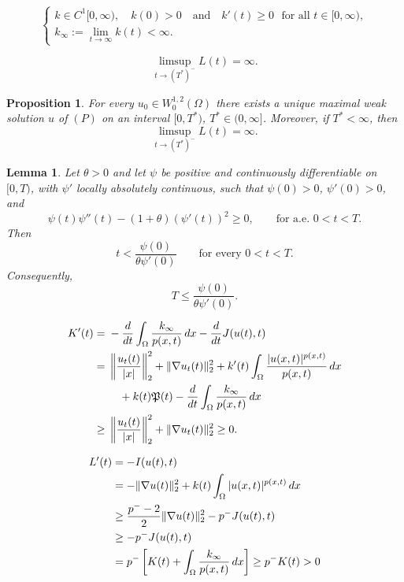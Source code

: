 \documentclass[10pt,a4paper]{amsart}
\newtheorem{proposition}{Proposition}
\newtheorem{lemma}{Lemma}
\begin{document}
\begin{equation} \label{eq:k-assumption}
	\begin{cases}
		k \in C^1[0,\infty), 
		\quad k(0) > 0
		\quad \mbox{and} \quad
		k'(t) \ge 0  \,\, \mbox{ for all } t \in [0,\infty),
		\\[2mm]
		k_\infty := \displaystyle\lim_{t\to\infty} k(t) < \infty.
	\end{cases}
\end{equation}

	\begin{equation} \label{eq:blowup}
		\limsup_{t\to(T^*)^-}L(t)=\infty.
	\end{equation}

\begin{proposition}\label{prop:local}
For every $u_0\in W^{1,2}_0(\Omega)$ there exists a unique maximal weak solution $u$ of $(P)$ on an interval $[0,T^*)$, $T^*\in(0,\infty]$. Moreover, if $T^*<\infty$, then
\[
\limsup_{t\to(T^*)^-}L(t)=\infty.
\]
\end{proposition}

\begin{lemma} \label{lem:concavity}
	Let $\theta>0$ and let $\psi$ be positive and continuously differentiable on $[0,T)$, with $\psi'$ locally absolutely continuous, such that
	$\psi(0)>0$, $\psi'(0)>0$, and
	\[
	\psi(t)\psi''(t)-(1+\theta)(\psi'(t))^2\ge0,
	\qquad \text{for a.e. }0<t<T.
	\]
	Then
	\[
	t<\frac{\psi(0)}{\theta\psi'(0)}
	\qquad\text{for every }0<t<T.
	\]
	Consequently,
	\[
	T\le\frac{\psi(0)}{\theta\psi'(0)}.
	\]
\end{lemma}

	\begin{align}
	K'(t)
	={}&-\frac{d}{dt}\int_\Omega\frac{k_\infty}{p(x,t)}\,dx
	-\frac{d}{dt}J(u(t),t) \notag\\
	={}&\left\|\frac{u_t(t)}{|x|}\right\|_2^2
	+\|\nabla u_t(t)\|_2^2
	+k'(t)\int_\Omega\frac{|u(x,t)|^{p(x,t)}}{p(x,t)}\,dx \notag\\
	&\quad +k(t)\mathfrak{P}(t)
	-\frac{d}{dt}\int_\Omega\frac{k_\infty}{p(x,t)}\,dx \notag\\
	\ge{}&\left\|\frac{u_t(t)}{|x|}\right\|_2^2
	+\|\nabla u_t(t)\|_2^2\ge0.
	\label{eq:K-derivative}
	\end{align}

	\begin{align}
	L'(t)
	&=-I(u(t),t) \notag\\
	&=-\|\nabla u(t)\|_2^2
	+k(t)\int_\Omega |u(x,t)|^{p(x,t)}\,dx \notag\\
	&\ge \frac{p^- -2}{2}\|\nabla u(t)\|_2^2-p^-J(u(t),t) \notag\\
	&\ge -p^-J(u(t),t) \notag\\
	&=p^-\left[K(t)+\int_\Omega\frac{k_\infty}{p(x,t)}\,dx\right]
	\ge p^-K(t)>0
	\label{eq:L-prime-negative}
	\end{align}
\end{document}
